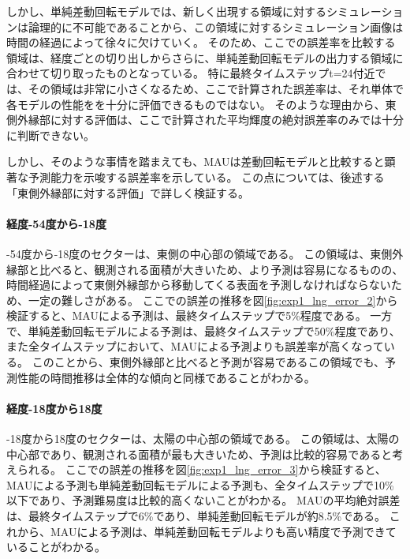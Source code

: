           しかし、単純差動回転モデルでは、新しく出現する領域に対するシミュレーションは論理的に不可能であることから、この領域に対するシミュレーション画像は時間の経過によって徐々に欠けていく。
          そのため、ここでの誤差率を比較する領域は、経度ごとの切り出しからさらに、単純差動回転モデルの出力する領域に合わせて切り取ったものとなっている。
          特に最終タイムステップt=24付近では、その領域は非常に小さくなるため、ここで計算された誤差率は、それ単体で各モデルの性能をを十分に評価できるものではない。
          そのような理由から、東側外縁部に対する評価は、ここで計算された平均輝度の絶対誤差率のみでは十分に判断できない。
          
          しかし、そのような事情を踏まえても、MAUは差動回転モデルと比較すると顕著な予測能力を示唆する誤差率を示している。
          この点については、後述する「東側外縁部に対する評価」で詳しく検証する。


          \paragraph{経度-54度から-18度}
          -54度から-18度のセクターは、東側の中心部の領域である。
          この領域は、東側外縁部と比べると、観測される面積が大きいため、より予測は容易になるものの、時間経過によって東側外縁部から移動してくる表面を予測しなければならないため、一定の難しさがある。
          ここでの誤差の推移を図\ref{fig:exp1_lng_error_2}から検証すると、MAUによる予測は、最終タイムステップで5\%程度である。
          一方で、単純差動回転モデルによる予測は、最終タイムステップで50\%程度であり、また全タイムステップにおいて、MAUによる予測よりも誤差率が高くなっている。
          このことから、東側外縁部と比べると予測が容易であるこの領域でも、予測性能の時間推移は全体的な傾向と同様であることがわかる。

          \paragraph{経度-18度から18度}
          -18度から18度のセクターは、太陽の中心部の領域である。
          この領域は、太陽の中心部であり、観測される面積が最も大きいため、予測は比較的容易であると考えられる。
          ここでの誤差の推移を図\ref{fig:exp1_lng_error_3}から検証すると、MAUによる予測も単純差動回転モデルによる予測も、全タイムステップで10\%以下であり、予測難易度は比較的高くないことがわかる。
          MAUの平均絶対誤差は、最終タイムステップで6\%であり、単純差動回転モデルが約8.5\%である。
          これから、MAUによる予測は、単純差動回転モデルよりも高い精度で予測できていることがわかる。
          
